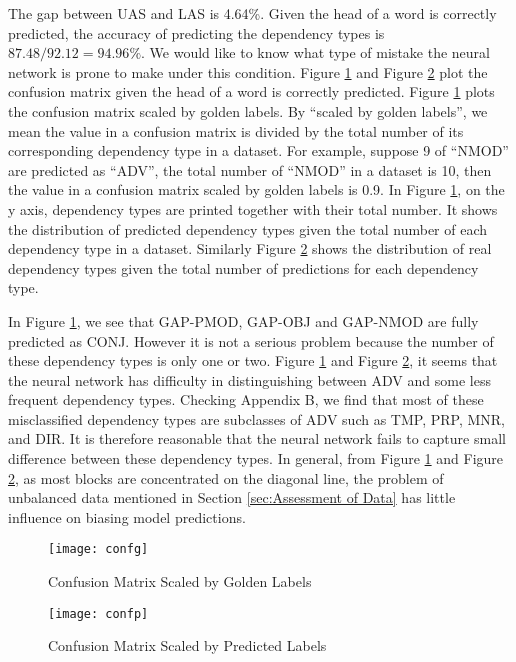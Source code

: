 The gap between UAS and LAS is 4.64\%. Given the head of a word is correctly predicted, the accuracy of predicting the dependency types is $87.48/92.12=94.96\%$. We would like to know what type of mistake the neural network is prone to make under this condition. Figure \ref{fig:confg} and Figure \ref{fig:confp} plot the confusion matrix given the head of a word is correctly predicted.  Figure \ref{fig:confg} plots the confusion matrix scaled by golden labels. By ``scaled by golden labels'', we mean the value in a confusion matrix is divided by the total number of its corresponding dependency type in a dataset. For example, suppose 9 of ``NMOD'' are predicted as ``ADV'', the total number of ``NMOD'' in a dataset is 10, then the value in a confusion matrix scaled by golden labels is 0.9. In Figure \ref{fig:confg}, on the y axis, dependency types are printed together with their total number. It shows the distribution of predicted dependency types given the total number of each dependency type in a dataset. Similarly Figure \ref{fig:confp} shows the distribution of real dependency types given the total number of predictions for each dependency type.

In Figure \ref{fig:confg}, we see that GAP-PMOD, GAP-OBJ and GAP-NMOD are fully predicted as CONJ. However it is not a serious problem because the number of these dependency types is only one or two.  Figure \ref{fig:confg} and Figure \ref{fig:confp}, it seems that the neural network has difficulty in distinguishing between ADV and some less frequent dependency types. Checking Appendix B, we find that most of these misclassified dependency types are subclasses of ADV such as TMP, PRP, MNR, and DIR. It is therefore reasonable that the neural network fails to capture small difference between these dependency types. In general, from Figure \ref{fig:confg} and Figure \ref{fig:confp}, as most blocks are concentrated on the diagonal line, the problem of unbalanced data mentioned in Section \ref{sec:Assessment of Data} has little influence on biasing model predictions.



\begin{figure}
  \centering
    \texttt{[image: confg]}
  \caption{Confusion Matrix Scaled by Golden Labels}
  \label{fig:confg}
\end{figure}

\begin{figure}
  \centering
    \texttt{[image: confp]}
  \caption{Confusion Matrix Scaled by Predicted Labels}
  \label{fig:confp}
\end{figure}


